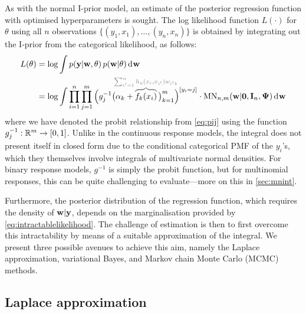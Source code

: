 
As with the normal I-prior model, an estimate of the posterior regression function with optimised hyperparameters is sought.
The log likelihood function $L(\cdot)$ for $\theta$ using all $n$ observations $\{(y_1,x_1),\dots,(y_n,x_n)\}$ is obtained by integrating out the I-prior from the categorical likelihood, as follows:
\begin{align}
  L(\theta) 
  &= \log \int p(\by | \bw, \theta) \, p(\bw|\theta) \dint \bw \nonumber \\
  &= \log \int \prod_{i=1}^n \prod_{j=1}^m \Big( g_j^{-1}\big(\alpha_k + 
  \greyoverbrace{f_k(x_i)}{\hidewidth\sum_{i'=1}^n h_\eta(x_i,x_{i'})w_{i'k}\hidewidth}
  \,\big)_{k=1}^m \Big)^{[y_i=j]} \cdot \MN_{n,m}(\bw|\bzero,\bI_n, \bPsi) \dint \bw \label{eq:intractablelikelihood}
\end{align}
where we have denoted the probit relationship from \cref{eq:pij} using the function $g_j^{-1}:\mathbb{R}^m \to [0,1]$.
Unlike in the continuous response models, the integral does not present itself in closed form due to the conditional categorical PMF of the $y_i$'s, which they themselves involve integrals of multivariate normal densities.
For binary response models, $g^{-1}$ is simply the probit function, but for multinomial responses, this can be quite challenging to evaluate---more on this in \cref{sec:mnint}.

Furthermore, the posterior distribution of the regression function, which requires the density of ${\mathbf w}|{\mathbf y}$, depends on the marginalisation provided by \cref{eq:intractablelikelihood}.
The challenge of estimation is then to first overcome this intractability by means of a suitable approximation of the integral.
We present three possible avenues to achieve this aim, namely the Laplace approximation, variational Bayes, and Markov chain Monte Carlo (MCMC) methods.

\subsection{Laplace approximation}

